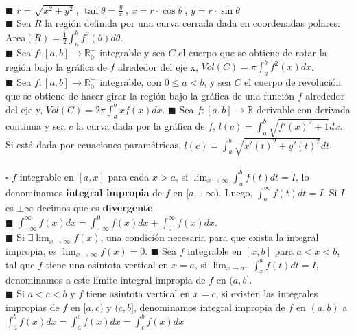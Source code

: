 \documentclass[11pt,a4paper]{article}
\begin{document}
\dotfill\\

$\blacksquare$ $r = \sqrt{x^2 + y^2}\ $, $\tan \theta = \frac{y}{x}\ $, $x = r \cdot \cos \theta\ $, $y = r \cdot \sin \theta$\\
$\blacksquare$ Sea $R$ la regi\'on definida por una curva cerrada dada en coordenadas polares: Area$(R) = \frac{1}{2}\int_a^b f^2(\theta)d\theta$.\\
$\blacksquare$ Sea $f:[a,b] \rightarrow \mathbb{R}_0^+$ integrable y sea $C$ el cuerpo que se obtiene de rotar la regi\'on bajo la gr\'afica de $f$ alrededor del eje x, $Vol(C) = \pi \int_a^b f^2(x)dx$.\\
$\blacksquare$ Sea $f:[a,b] \rightarrow \mathbb{R}_0^+$ integrable, con $0 \leq a < b$, y sea $C$ el cuerpo de revoluci\'on que se obtiene de hacer girar la regi\'on bajo la gr\'afica de una funci\'on $f$ alrededor del eje y, $Vol(C) = 2\pi \int_a^b xf(x)dx$.
$\blacksquare$ Sea $f:[a,b] \rightarrow \mathbb{R}$ derivable con derivada continua y sea $c$ la curva dada por la gr\'afica de $f$, $l(c) = \int_a^b \sqrt{f'(x)^2 + 1} dx$. Si est\'a dada por ecuaciones param\'etricas, $l(c)=\int_a^b \sqrt{x'(t)^2 + y'(t)^2} dt$.\\

\dotfill\\

$\square$ $f$ integrable en $[a,x]$ para cada $x>a$, si $\lim_{x \to \infty} \int_a^b f(t)dt = I$, lo denominamos \textbf{integral impropia} de $f$ en $[a,+\infty)$. Luego, $\int_a^\infty f(t)dt = I$. Si $I$ es $\pm \infty$ decimos que es \textbf{divergente}.\\
$\blacksquare$ $\int_{-\infty}^\infty f(x)dx = \int_{-\infty}^0 f(x)dx + \int_{0}^\infty f(x)dx$.\\
$\blacksquare$ Si $\exists \lim_{x \to \infty} f(x)$, una condici\'on necesaria para que exista la integral impropia, es $\lim_{x \to \infty} f(x) = 0$.
$\blacksquare$ Sea $f$ integrable en $[x,b]$ para $a < x < b$, tal que $f$ tiene una asintota vertical en $x=a$, si $\lim_{x \to a^+} \int_x^a f(t)dt = I$, denominamos a este limite integral impropia de $f$ en $(a,b]$.\\
$\blacksquare$ Si $a < c < b$ y $f$ tiene asintota vertical en $x = c$, si existen las integrales impropias de $f$ en $[a,c)$ y $(c,b]$, denominamos integral impropia de $f$ en $(a,b)$ a $\int_a^bf(x)dx = \int_a^cf(x)dx = \int_c^bf(x)dx$\\

\dotfill\\
\end{document}
